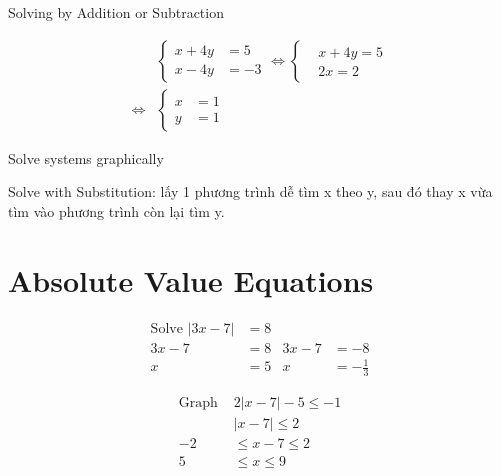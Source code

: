 
Solving by Addition or Subtraction

\[
  \begin{aligned}
    &\left\{\begin{aligned} 
      x + 4y &= 5 \\ 
      x - 4y &= -3
    \end{aligned}\right. \iff 
    \left\{\begin{aligned}
      &x +4y = 5\\ 
      &2x = 2
    \end{aligned}\right.
    \\
    \iff &\left\{\begin{aligned} 
      x &= 1 \\ 
      y &= 1
    \end{aligned}\right.
  \end{aligned}
\]

Solve systems graphically

Solve with Substitution: lấy 1 phương trình dễ tìm x theo y, sau đó thay x vừa tìm vào phương trình còn lại tìm y.

\section{Absolute Value Equations}

\begin{align*}
  \text{Solve } |3x-7| &= 8\\
  3x-7&=8      &  3x-7&=-8\\
  x&=5         &  x&=-\frac{1}{3}
\end{align*}

\vspace{5mm}

\begin{align*}
  \text{Graph } &2|x-7 | -5 \leq -1\\
  &|x-7 | \leq 2\\
  -2 &\leq x-7 \leq 2\\
  5 &\leq x \leq 9
\end{align*}

